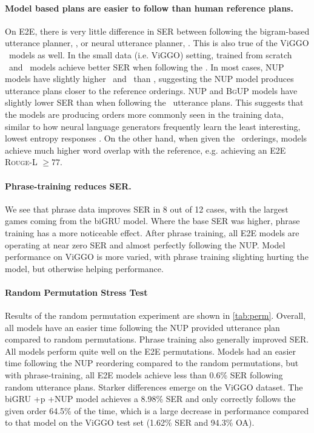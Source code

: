 \paragraph{Model based plans are easier to follow than human reference plans.
} On E2E, there is very little difference in SER between following the
bigram-based utterance planner, \BgUP, or neural utterance planner,
\NUP. This is also true of the ViGGO \BART~models as well.  In the
small data (i.e. ViGGO) setting, trained from scratch \biGRU~and \Transformer~models achieve better SER when following the \NUP.  In most cases,
NUP models have slightly higher \bleu~and \rougel~than
\BgUP, suggesting the NUP model produces utterance plans closer to
the reference orderings. NUP and \textsc{BgUP} models have slightly lower SER
than when following the \Oracle~utterance plans.  This suggests that the models
are producing orders more commonly seen in the training data, similar to how
neural language generators frequently learn the least interesting, lowest
entropy responses \cite{serban2016}.  On the other hand, when given
the \Oracle~orderings, models achieve much higher word overlap with the
reference, e.g. achieving an E2E \textsc{Rouge-L} $\ge 77$.



\paragraph{Phrase-training reduces SER.} We see that phrase data improves SER
in 8 out of 12 cases, with the largest games coming from the biGRU
 model.  Where the base SER was higher, phrase training has a more
noticeable effect. After phrase training, all E2E models are operating at near
zero SER and almost perfectly following the NUP. Model performance on ViGGO
is more varied, with phrase training slighting hurting the
 model, but otherwise helping performance.

\paragraph{Random Permutation Stress Test} Results of the random permutation
experiment are shown in \autoref{tab:perm}.  Overall, all models have an
easier time following the NUP provided utterance plan compared to random
permutations. Phrase training also generally improved SER.  All models perform
quite well on the E2E permutations.  Models had an easier time following the
NUP reordering compared to the random permutations, but with phrase-training,
all E2E models achieve less than 0.6\% SER following random utterance plans.
Starker differences emerge on the ViGGO dataset.  The biGRU +p +NUP model
achieves a 8.98\% SER and only correctly follows the given order 64.5\% of
the time, which is a large decrease in performance compared to that model on
the ViGGO test set (1.62\% SER and 94.3\% OA).

